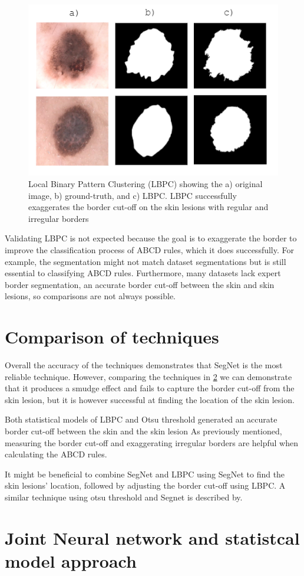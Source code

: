 \begin{figure}
\centering
\includegraphics[scale=1.2]{images/borders.PNG}
\caption{Local Binary Pattern Clustering (LBPC) showing the a) original image, b) ground-truth, and c) LBPC. LBPC successfully exaggerates the border cut-off on the skin lesions with regular and irregular borders} 
\end{figure} \label{fractal1}

Validating LBPC is not expected because the goal is to exaggerate the border to improve the classification process of ABCD rules, which it does successfully\cite{Pereira2020, Kaya2016}. For example, the segmentation might not match dataset segmentations but is still essential to classifying ABCD rules. Furthermore, many datasets lack expert border segmentation, an accurate border cut-off between the skin and skin lesions, so comparisons are not always possible.

\section{Comparison of techniques}
Overall the accuracy of the techniques demonstrates that SegNet is the most reliable technique. However, comparing the techniques in \ref{} we can demonstrate that it produces a smudge effect and fails to capture the border cut-off from the skin lesion, but it is however successful at finding the location of the skin lesion.

Both statistical models of LBPC and Otsu threshold generated an accurate border cut-off between the skin and the skin lesion As previously mentioned, measuring the border cut-off and exaggerating irregular borders are helpful when calculating the ABCD rules. 

It might be beneficial to combine SegNet and LBPC using SegNet to find the skin lesions' location, followed by adjusting the border cut-off using LBPC. A similar technique using otsu threshold and Segnet is described by\cite{Riaz2019}.

\section{Joint Neural network and statistcal model approach}
